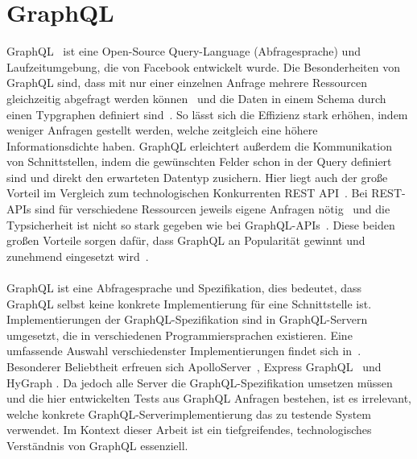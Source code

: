 \section{GraphQL}
\label{graphql}

GraphQL~\cite{graphqlspecification} ist eine Open-Source Query-Language (Abfragesprache) und Laufzeitumgebung, die von Facebook entwickelt wurde\cite[vgl. Introduction]{graphqlspecification}.
Die Besonderheiten von GraphQL sind, dass mit nur einer einzelnen Anfrage mehrere Ressourcen gleichzeitig abgefragt werden können~\cite[vgl. No More Over- and Underfetching]{howtographql} und die
Daten in einem Schema durch einen Typgraphen definiert sind~\cite[vgl. Benefits of a Schema \& Type System]{howtographql}.
So lässt sich die Effizienz stark erhöhen, indem weniger Anfragen gestellt werden, welche zeitgleich eine höhere Informationsdichte haben.
GraphQL erleichtert außerdem die Kommunikation von Schnittstellen, indem die gewünschten Felder schon in der Query definiert sind und direkt den erwarteten Datentyp zusichern.
Hier liegt auch der große Vorteil im Vergleich zum technologischen Konkurrenten  REST API~\cite[vgl. Welche REST-Einschränkungen versucht GraphQL zu überwinden?]{awsrestgraphql}.
Bei REST-APIs sind für verschiedene Ressourcen jeweils eigene Anfragen nötig~\cite[vgl. No More Over- and Underfetching]{howtographql} und die Typsicherheit ist nicht so stark gegeben
wie bei GraphQL-APIs~\cite[vgl. Zusammenfassung der Unterschiede: REST vs. GraphQL]{awsrestgraphql}.
Diese beiden großen Vorteile sorgen dafür, dass GraphQL an Popularität gewinnt und zunehmend eingesetzt wird~\cite[vgl. Continued growth and the road ahead]{graphql-growing-report}.
\\
\\
GraphQL ist eine Abfragesprache und Spezifikation, dies bedeutet, dass GraphQL selbst keine konkrete Implementierung für eine Schnittstelle ist.
Implementierungen der GraphQL-Spezifikation sind in GraphQL-Servern umgesetzt, die in verschiedenen Programmiersprachen existieren.
Eine umfassende Auswahl verschiedenster Implementierungen findet sich in~\cite{gqlimplementation}.
Besonderer Beliebtheit erfreuen sich ApolloServer~\cite{apolloqgl}, Express GraphQL~\cite{expressgql} und HyGraph \cite{hygql}.
Da jedoch alle Server die GraphQL-Spezifikation umsetzen müssen und die hier entwickelten Tests aus GraphQL Anfragen bestehen, ist es irrelevant, welche konkrete GraphQL-Serverimplementierung das zu testende System verwendet.
Im Kontext dieser Arbeit ist ein tiefgreifendes, technologisches Verständnis von GraphQL essenziell.

